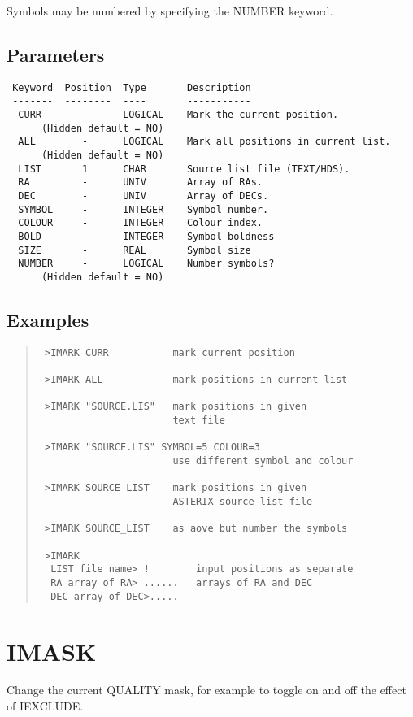 \documentclass{book}
\renewcommand{\_}{{\tt\char'137}}     %
\begin{document}
Symbols may be numbered by specifying the NUMBER keyword.
 
\subsection{Parameters}
\begin{verbatim}
 Keyword  Position  Type       Description
 -------  --------  ----       -----------
  CURR       -      LOGICAL    Mark the current position.
      (Hidden default = NO)
  ALL        -      LOGICAL    Mark all positions in current list.
      (Hidden default = NO)
  LIST       1      CHAR       Source list file (TEXT/HDS).
  RA         -      UNIV       Array of RAs.
  DEC        -      UNIV       Array of DECs.
  SYMBOL     -      INTEGER    Symbol number.
  COLOUR     -      INTEGER    Colour index.
  BOLD       -      INTEGER    Symbol boldness
  SIZE       -      REAL       Symbol size
  NUMBER     -      LOGICAL    Number symbols?
      (Hidden default = NO)
\end{verbatim}\subsection{Examples}
\begin{quote}\begin{verbatim}
 >IMARK CURR           mark current position
 
 >IMARK ALL            mark positions in current list
 
 >IMARK "SOURCE.LIS"   mark positions in given
                       text file
 
 >IMARK "SOURCE.LIS" SYMBOL=5 COLOUR=3
                       use different symbol and colour
 
 >IMARK SOURCE_LIST    mark positions in given
                       ASTERIX source list file
 
 >IMARK SOURCE_LIST    as aove but number the symbols
 
 >IMARK
  LIST file name> !        input positions as separate
  RA array of RA> ......   arrays of RA and DEC
  DEC array of DEC>.....
 \end{verbatim}\end{quote}
\section{IMASK}
Change the current QUALITY mask, for example to toggle on
and off the effect of IEXCLUDE.
 
\end{document}
